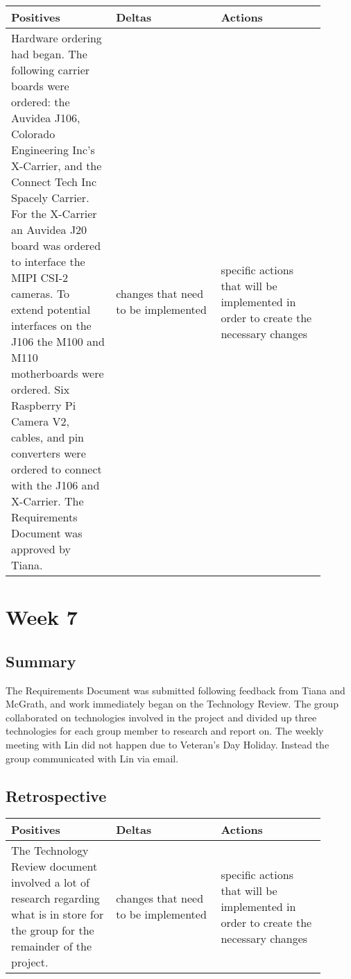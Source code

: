 \documentclass[letterpaper,10pt,serif,draftclsnofoot,onecolumn,compsoc,titlepage]{IEEEtran}
\begin{document}
\begin{tabular}{|p{0.3\linewidth}|p{0.3\linewidth}|p{0.3\linewidth}|}
   \hline
   \textbf{Positives} & \textbf{Deltas} & \textbf{Actions}\\ 
   \hline
   Hardware ordering had began. The following carrier boards were ordered: the Auvidea 
   J106, Colorado Engineering Inc's X-Carrier, and the Connect Tech Inc Spacely Carrier. 
   For the X-Carrier an Auvidea J20 board was ordered to interface the MIPI CSI-2 
   cameras. To extend potential interfaces on the J106 the M100 and M110 motherboards 
   were ordered. Six Raspberry Pi Camera V2, cables, and pin converters were ordered 
   to connect with the J106 and X-Carrier. The Requirements Document was approved by 
   Tiana.
   & 
   changes that need to be implemented 
   & 
   specific actions that will be implemented in order to create the necessary 
   changes \\
   \hline
\end{tabular}

\section{Week 7}

\subsection{Summary}

The Requirements Document was submitted following feedback from Tiana and McGrath, 
and work immediately began on the Technology Review. The group collaborated on 
technologies involved in the project and divided up three technologies for each 
group member to research and report on. The weekly meeting with Lin did not happen 
due to Veteran's Day Holiday. Instead the group communicated with Lin via email. \\

\subsection{Retrospective}

\begin{tabular}{|p{0.3\linewidth}|p{0.3\linewidth}|p{0.3\linewidth}|}
   \hline
   \textbf{Positives} & \textbf{Deltas} & \textbf{Actions}\\ 
   \hline
   The Technology Review document involved a lot of research regarding what is in 
   store for the group for the remainder of the project.  
   & 
   changes that need to be implemented 
   & 
   specific actions that will be implemented in order to create the necessary 
   changes \\
   \hline
\end{tabular}
\end{document}
